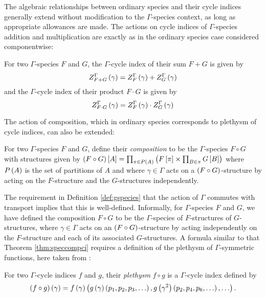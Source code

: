 \documentclass[distribution,draft]{brandiss} %
\numberwithin{section}{chapter}
\numberwithin{figure}{chapter}
\begin{document}
The algebraic relationships between ordinary species and their cycle indices generally extend without modification to the $\Gamma$-species context, as long as appropriate allowances are made.
The actions on cycle indices of $\Gamma$-species addition and multiplication are exactly as in the ordinary species case considered componentwise:
\begin{definition}
  \label{def:gspecsumprod}
  For two $\Gamma$-species $F$ and $G$, the $\Gamma$-cycle index of their sum $F + G$ is given by
  \begin{equation}
    \label{eq:gspecsum}
     Z_{F + G}^{{\Gamma} {}}  \left( {\gamma} \right) =  Z_{F}^{{\Gamma} {}}  \left( {\gamma} \right) +  Z_{G}^{{\Gamma} {}}  \left( {\gamma} \right)
  \end{equation}
  and the $\Gamma$-cycle index of their product $F \cdot G$ is given by
  \begin{equation}
    \label{eq:gspecprod}
     Z_{F \cdot G}^{{\Gamma} {}}  \left( {\gamma} \right) =  Z_{F}^{{\Gamma} {}}  \left( {\gamma} \right) \cdot  Z_{G}^{{\Gamma} {}}  \left( {\gamma} \right)
  \end{equation}
\end{definition}
The action of composition, which in ordinary species corresponds to plethysm of cycle indices, can also be extended:
\begin{definition}
  \label{def:gspeccomp}
  For two $\Gamma$-species $F$ and $G$, define their \emph{composition} to be the $\Gamma$-species $F \circ G$ with structures given by $\left( {F \circ G} \right) \left[ {A} \right] = \prod_{\pi \in P \left( {A} \right)} \left( {F \left[ {\pi} \right] \times \prod_{B \in \pi} G \left[ {B} \right]} \right)$ where $P \left( {A} \right)$ is the set of partitions of $A$ and where $\gamma \in \Gamma$ acts on a $\left( {F \circ G} \right)$-structure by acting on the $F$-structure and the $G$-structures independently.
\end{definition}
The requirement in Definition \ref{def:gspecies} that the action of $\Gamma$ commutes with transport implies that this is well-defined.
Informally, for $\Gamma$-species $F$ and $G$, we have defined the composition $F \circ G$ to be the $\Gamma$-species of $F$-structures of $G$-structures, where $\gamma \in \Gamma$ acts on an $\left( {F \circ G} \right)$-structure by acting independently on the $F$-structure and each of its associated $G$-structures.
A formula similar to that Theorem \ref{thm:speccompci} requires a definition of the plethysm of $\Gamma$-symmetric functions, here taken from \cite[\S 3]{hend:specfield}:
\begin{definition}
  \label{def:gcipleth}
  For two $\Gamma$-cycle indices $f$ and $g$, their \emph{plethysm} $f \circ g$ is a $\Gamma$-cycle index defined by
  \begin{equation}
    \left( {f \circ g} \right) \left( {\gamma} \right) = f \left( {\gamma} \right) \left( {g \left( {\gamma} \right) \left( {p_{1}, p_{2}, p_{3}, \dots} \right), g \left( {\gamma^{2}} \right) \left( {p_{2}, p_{4}, p_{6}, \dots} \right), \dots} \right).
    \label{eq:gcipleth}
  \end{equation}
\end{definition}
\end{document}
